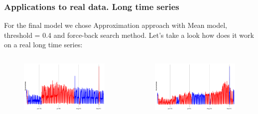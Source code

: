 \documentclass[intlimits, 9pt, unicode]{beamer}
\begin{document}
\begin{frame}
    \frametitle{Applications to real data. Long time series}
For the final model we chose Approximation approach with Mean model, threshold = 0.4 and force-back search method.
Let's take a look how does it work on a real long time series:
  \begin{columns}[T,onlytextwidth]
	\begin{figure}
	\includegraphics[scale=0.16]{images/long_ts_1}
	\end{figure}
      	\begin{figure}
	\includegraphics[scale=0.16]{images/long_ts_2}
	\end{figure}

     \end{columns}
\end{frame}



\end{document}
